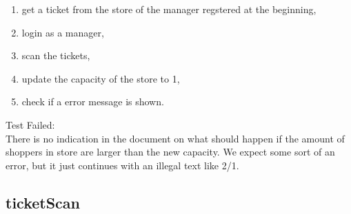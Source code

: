\begin{itemize}
\begin{enumerate}
        \item get a ticket from the store of the manager regstered at the beginning,

        \item login as a manager,

        \item scan the tickets,

        \item update the capacity of the store to 1,

        \item check if a error message is shown.
    \end{enumerate}
    Test Failed: \\
    There is no indication in the document on what should happen if the amount of shoppers in store are larger than the new capacity.
    We expect some sort of an error, but it just continues with an illegal text like 2/1.
\end{itemize}

\subsection{ticketScan}

